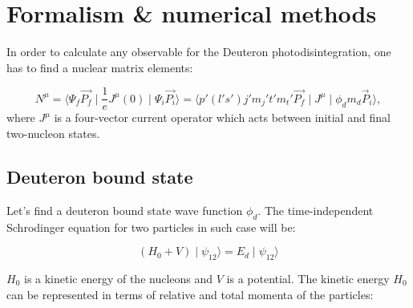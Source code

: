 \chapter{Formalism \& numerical methods}


In order to calculate any observable for the Deuteron photodisintegration,
one has to find a nuclear matrix elements:

\begin{equation}
    N^\mu = \langle \Psi_f \vec{P_f} \mid \frac{1}{e}J^\mu(0) \mid \Psi_i \vec{P_i} \rangle =
    \langle p' (l's')j'm_j't'm_t' \vec{P_f} \mid J^\mu \mid \phi_d m_d \vec{P}_i \rangle, 
\end{equation}
where $J^\mu$ is a four-vector current operator which acts between initial and final 
two-nucleon states. 



\section{Deuteron bound state}
    \label{sec:deut_bound}

    Let's find a deuteron bound state wave function $\phi_d$. The time-independent Schrodinger
    equation for two particles in such case will be:

    \begin{equation}
        (H_0 + V) \mid \psi_{12} \rangle  = E_d \mid \psi_{12} \rangle
        \label{shrod_bound}
    \end{equation}

    $H_0$ is a kinetic energy of the nucleons and $V$ is a potential. 
    The kinetic energy $H_0$ can be represented in terms of  relative and total momenta
    of the particles:

